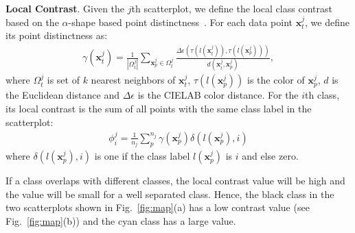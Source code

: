 \vspace{2mm}
\noindent\textbf{Local Contrast}.
Given the $j$th scatterplot, we define the local class contrast based on the $\alpha$-shape based point distinctness~\cite{Lu21}.  For each data point $\mathbf{x}^j_t$, we define its point distinctness  as:
\begin{align}
 \gamma (\mathbf{x}^j_t)=\frac{1}{|\Omega^j_t|} \sum_{\mathbf{x}^j_p \in \Omega^j_t}  \frac{\Delta\epsilon(\tau(l(\mathbf{x}^j_t)),\tau(l(\mathbf{x}^j_p)))}{d(\mathbf{x}^j_t,\mathbf{x}^j_p)} \nonumber ,
\end{align}
where $\Omega^j_t$ is set of $k$ nearest neighbors of $\mathbf{x}^j_t$, $\tau(l(\mathbf{x}^j_p))$ is the color of $\mathbf{x}^j_p$,  $d$ is the Euclidean distance and $\Delta\epsilon$ is the CIELAB color distance.
For the $i$th class, its local contrast is the sum of all points with the same class label in the scatterplot:
\begin{align}\label{eq:nc}
 \phi^j_i = \frac{1}{n_j}\sum^{n_j}_{p}\gamma(\mathbf{x}^j_p) \delta(l(\mathbf{x}^j_p),i)
\end{align}
where $\delta(l(\mathbf{x}^j_p),i)$ is one if the class label $l(\mathbf{x}^j_p)$ is $i$ and else zero.

If a class overlaps with different classes, the local contrast value will be high and the value will be small for a well separated class. Hence, the black class  in the  two scatterplots shown in Fig.~\ref{fig:map}(a)  has a low contrast value (see Fig.~\ref{fig:map}(b)) and the cyan class has a large value.


